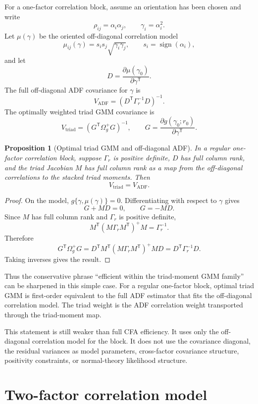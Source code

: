 \documentclass[11pt]{article}
\newcommand{\T}{^{\mathsf T}}
\theoremstyle{plain}
\newtheorem{proposition}{Proposition}
\theoremstyle{remark}
\begin{document}
For a one-factor correlation block, assume an orientation has been chosen and
write
\[
  \rho_{ij}=\alpha_i\alpha_j,
  \qquad
  \gamma_i=\alpha_i^2 .
\]
Let \(\mu(\gamma)\) be the oriented off-diagonal correlation model
\[
  \mu_{ij}(\gamma)=s_is_j\sqrt{\gamma_i\gamma_j},
  \qquad
  s_i=\operatorname{sign}(\alpha_i),
\]
and let
\[
  D=\frac{\partial \mu(\gamma_0)}{\partial \gamma\T}.
\]
The full off-diagonal ADF covariance for \(\gamma\) is
\[
  V_{\mathrm{ADF}}
  =
  (D\T\Gamma_r^{-1}D)^{-1}.
\]
The optimally weighted triad GMM covariance is
\[
  V_{\mathrm{triad}}
  =
  (G\T\Omega_g^{+}G)^{-1},
  \qquad
  G=\frac{\partial g(\gamma_0;r_0)}{\partial \gamma\T}.
\]

\begin{proposition}[Optimal triad GMM and off-diagonal ADF]
\label{prop:triad-adf}
In a regular one-factor correlation block, suppose \(\Gamma_r\) is positive
definite, \(D\) has full column rank, and the triad Jacobian \(M\) has full
column rank as a map from the off-diagonal correlations to the stacked triad
moments. Then
\[
  V_{\mathrm{triad}}=V_{\mathrm{ADF}} .
\]
\end{proposition}

\begin{proof}
On the model, \(g\{\gamma,\mu(\gamma)\}=0\). Differentiating with respect to
\(\gamma\) gives
\[
  G+MD=0,
  \qquad
  G=-MD .
\]
Since \(M\) has full column rank and \(\Gamma_r\) is positive definite,
\[
  M\T(M\Gamma_rM\T)^{+}M=\Gamma_r^{-1}.
\]
Therefore
\[
  G\T\Omega_g^{+}G
  =
  D\T M\T(M\Gamma_rM\T)^{+}M D
  =
  D\T\Gamma_r^{-1}D .
\]
Taking inverses gives the result.
\end{proof}

Thus the conservative phrase ``efficient within the triad-moment GMM family''
can be sharpened in this simple case. For a regular one-factor block, optimal
triad GMM is first-order equivalent to the full ADF estimator that fits the
off-diagonal correlation model. The triad weight is the ADF correlation weight
transported through the triad-moment map.

This statement is still weaker than full CFA efficiency. It uses only the
off-diagonal correlation model for the block. It does not use the covariance
diagonal, the residual variances as model parameters, cross-factor covariance
structure, positivity constraints, or normal-theory likelihood structure.

\section{Two-factor correlation model}
\end{document}
